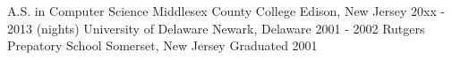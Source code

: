 

\begin{cventries}

  \cventry
    {A.S. in Computer Science} %
    {Middlesex County College} %
    {Edison, New Jersey} %
    {20xx - 2013 (nights)} %
    {}
  \cventry
    {} %
    {University of Delaware} %
    {Newark, Delaware} %
    {2001 - 2002}
    {}
  \cventry
    {} %
    {Rutgers Prepatory School} %
    {Somerset, New Jersey} %
    {Graduated 2001}
    {}



\end{cventries}
